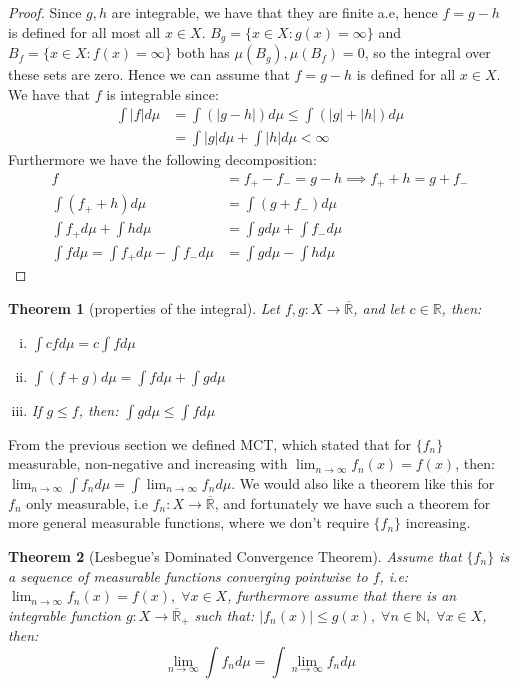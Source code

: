 \documentclass{article}
\newcommand{\R}{\mathbb{R}}
\newcommand{\N}{\mathbb{N}}
\newcommand{\Rbar}{\overline{\mathbb{R}}}%
\newtheorem{proof}{Proof}
\newtheorem{theorem}{Theorem}
\begin{document}
\begin{proof}
Since $g,h$ are integrable, we have that they are finite a.e, hence $f = g-h$ is defined for all most all $x\in X$. $B_{g} = \{x\in X: g(x) = \infty\}$ and $B_{f} = \{x\in X: f(x) = \infty\}$ both has $\mu(B_{g}), \mu(B_{f}) = 0$, so the integral over these sets are zero. Hence we can assume that $f = g-h$ is defined for all $x\in X$.\\ 
We have that $f$ is integrable since: 
\begin{align*}
\int |f|d\mu &= \int (|g-h|)d\mu \leq \int (|g| + |h|)d\mu\\   
&= \int |g|d\mu + \int |h|d\mu < \infty
\end{align*}
Furthermore we have the following decomposition: 
\begin{align*}
f &= f_{+}-f_{-} = g-h \implies f_{+}+h = g + f_{-}\\ 
\int  (f_{+}+h)d\mu &= \int (g + f_{-})d\mu\\ 
\int f_{+}d\mu + \int hd\mu &= \int gd\mu + \int f_{-}d\mu \\ 
\int fd\mu = \int f_{+}d\mu - \int f_{-}d\mu &= \int gd\mu - \int hd\mu
\end{align*}
\end{proof}

\begin{theorem}[properties of the integral]
Let $f,g:X\to \Rbar$, and let $c\in \R$, then: 
\begin{enumerate}[i)]
    \item $\int cfd\mu = c\int fd\mu$
    \item $\int (f+g)d\mu = \int fd\mu + \int gd\mu  $
    \item If $g\leq f$, then: $\int gd\mu \leq \int fd\mu $
\end{enumerate}
\end{theorem}

From the previous section we defined MCT, which stated that for $\{f_{n}\}$ measurable, non-negative and increasing with $\lim_{n\to \infty}f_{n}(x) = f(x)$, then:\\ 
$\lim_{n\to \infty}\int f_{n}d\mu = \int \lim_{n\to \infty}f_{n}d\mu$. We would also like a theorem like this for $f_{n}$ only measurable, i.e $f_{n}:X\to \Rbar$, and fortunately we have such a theorem for more general measurable functions, where we don't require $\{f_{n}\}$ increasing.

\begin{theorem}[Lesbegue's Dominated Convergence Theorem]
Assume that $\{f_{n}\}$ is a sequence of measurable functions converging pointwise to $f$, i.e: $\lim_{n\to \infty}f_{n}(x) = f(x), \; \forall x\in X$, furthermore assume that there is an integrable function $g:X \to \Rbar_{+}$ such that: $|f_{n}(x)| \leq g(x),\; \forall n\in \N, \; \forall x\in X$, then: 
\[\lim_{n\to \infty}\int f_{n}d\mu = \int \lim_{n\to \infty}f_{n}d\mu
\]
\end{theorem}
\end{document}
